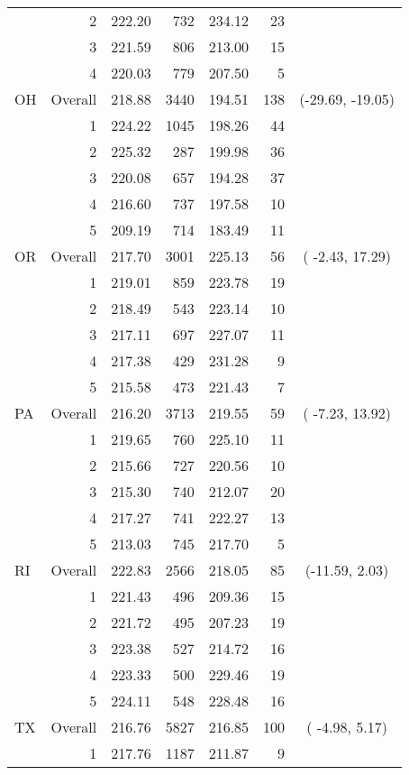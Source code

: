 \begin{longtable}{lrrr@{\extracolsep{.25cm}}rrc}
   & 2 & 222.20 & 732 & 234.12 &  23 &  \\ 
   & 3 & 221.59 & 806 & 213.00 &  15 &  \\ 
   & 4 & 220.03 & 779 & 207.50 &   5 &  \\ 
   \hline
OH & Overall & 218.88 & 3440 & 194.51 & 138 & (-29.69, -19.05) \\ 
   & 1 & 224.22 & 1045 & 198.26 &  44 &  \\ 
   & 2 & 225.32 & 287 & 199.98 &  36 &  \\ 
   & 3 & 220.08 & 657 & 194.28 &  37 &  \\ 
   & 4 & 216.60 & 737 & 197.58 &  10 &  \\ 
   & 5 & 209.19 & 714 & 183.49 &  11 &  \\ 
   \hline
OR & Overall & 217.70 & 3001 & 225.13 &  56 & ( -2.43,  17.29) \\ 
   & 1 & 219.01 & 859 & 223.78 &  19 &  \\ 
   & 2 & 218.49 & 543 & 223.14 &  10 &  \\ 
   & 3 & 217.11 & 697 & 227.07 &  11 &  \\ 
   & 4 & 217.38 & 429 & 231.28 &   9 &  \\ 
   & 5 & 215.58 & 473 & 221.43 &   7 &  \\ 
   \hline
PA & Overall & 216.20 & 3713 & 219.55 &  59 & ( -7.23,  13.92) \\ 
   & 1 & 219.65 & 760 & 225.10 &  11 &  \\ 
   & 2 & 215.66 & 727 & 220.56 &  10 &  \\ 
   & 3 & 215.30 & 740 & 212.07 &  20 &  \\ 
   & 4 & 217.27 & 741 & 222.27 &  13 &  \\ 
   & 5 & 213.03 & 745 & 217.70 &   5 &  \\ 
   \hline
RI & Overall & 222.83 & 2566 & 218.05 &  85 & (-11.59,   2.03) \\ 
   & 1 & 221.43 & 496 & 209.36 &  15 &  \\ 
   & 2 & 221.72 & 495 & 207.23 &  19 &  \\ 
   & 3 & 223.38 & 527 & 214.72 &  16 &  \\ 
   & 4 & 223.33 & 500 & 229.46 &  19 &  \\ 
   & 5 & 224.11 & 548 & 228.48 &  16 &  \\ 
   \hline
TX & Overall & 216.76 & 5827 & 216.85 & 100 & ( -4.98,   5.17) \\ 
   & 1 & 217.76 & 1187 & 211.87 &   9 &  \\ 

\end{longtable}
